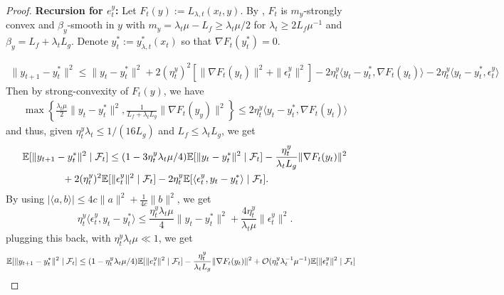\documentclass{uai2026} %
\begin{document}
\begin{proof}
\textbf{Recursion for $e_{t}^{y}$:} Let $F_t(y):=L_{\lambda,t}(x_t,y)$. By , $F_t$ is $m_y$-strongly convex and $\beta_y$-smooth in $y$
with $m_y=\lambda_t\mu-L_{f}\ge\lambda_{t}\mu/2$ for $\lambda_{t}\ge 2L_{f}\mu^{-1}$ and $\beta_y=L_f+\lambda_t L_g$. Denote $y_t^{*}:=y^{*}_{\lambda,t}(x_t)$ so that $\nabla F_t(y_t^{*})=0$.

\begin{align}
    \|y_{t+1}-y_t^{*}\|^{2}\le\|y_{t}-y_{t}^{{*}}\|^{2}+2(\eta_{t}^{y})^{2}[\|\nabla F_{t}(y_{t})\|^{2}+\|\epsilon_{t}^{y}\|^{2}]-2\eta_{t}^{y}\langle y_{t}-y_{t}^{{*}},\nabla F_{t}(y_{t})\rangle-2\eta_{t}^{y}\langle y_{t}-y_{t}^{{*}},\epsilon_{t}^{y}\rangle
\end{align}
Then by strong-convexity of $F_{t}(y)$, we have
\begin{align}
    \max\left\{\frac{\lambda_{t}\mu}{2}\|y_{t}-y_{t}^{*}\|^{2},\frac{1}{L_{f}+\lambda_{t}L_{g}}\|\nabla F_{t}(y_{y})\|^{2}\right\}\le2\eta_{t}^{y}\langle y_{t}-y_{t}^{{*}},\nabla F_{t}(y_{t})\rangle
\end{align}
and thus, given $\eta_{t}^{y}\lambda_{t}\le 1/(16L_{g})$ and $L_{f}\le \lambda_{t}L_{g}$, we get
\begin{align}
    \MoveEqLeft[4]\mathbb{E}[\|y_{t+1}-y_t^{*}\|^{2}\mid\mathcal{F}_{t}]\le (1-3\eta_{t}^{y}\lambda_{t}\mu/4)\mathbb{E}[\|y_{t}-y_t^{*}\|^{2}\mid\mathcal{F}_{t}]-\frac{\eta_{t}^{y}}{\lambda_{t}L_{g}}\|\nabla F_{t}(y_{t})\|^{2}\nonumber\\
    &+2(\eta_{t}^{y})^{2}\mathbb{E}[\|\epsilon_{t}^{y}\|^{2}\mid\mathcal{F}_{t}]-2\eta_{t}^{y}\mathbb{E}[\langle\epsilon_{t}^{y},y_{t}-y^{*}_{t}\rangle\mid\mathcal{F}_{t}].
\end{align}
By using $|\langle a,b\rangle|\le 4c\|a\|^{2}+\frac{1}{4c}\|b\|^{2}$, we get
\[
\eta_{t}^{y}\langle\epsilon_{t}^{y},y_{t}-y^{*}_{t}\rangle\le \frac{\eta_{t}^{y}\lambda_{t}\mu}{4}\|y_{t}-y_{t}^{*}\|^{2}+\frac{4\eta_{t}^{y}}{\lambda_{t}\mu}\|\epsilon_{t}^{y}\|^{2}.
\]
plugging this back, with $\eta_{t}^{y}\lambda_{t}\mu\ll 1$, we get
\begin{align}\label{eq:opt1-fixed-y}
    \MoveEqLeft[4]\mathbb{E}[\|y_{t+1}-y_t^{*}\|^{2}\mid\mathcal{F}_{t}]\le (1-\eta_{t}^{y}\lambda_{t}\mu/4)\mathbb{E}[\|e_{t}^{y}\|^{2}\mid\mathcal{F}_{t}]-\frac{\eta_{t}^{y}}{\lambda_{t}L_{g}}\|\nabla F_{t}(y_{t})\|^{2}+\mathcal{O}(\eta_{t}^{y}\lambda_{t}^{-1}\mu^{-1})\mathbb{E}[\|\epsilon_{t}^{y}\|^{2}\mid \mathcal{F}_{t}]
\end{align}

\end{proof}
\end{document}
